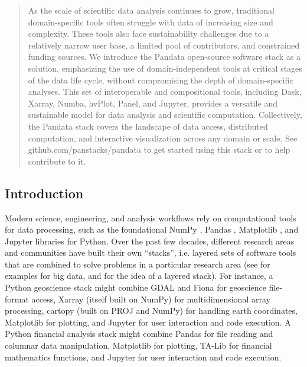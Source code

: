\begin{abstract}
    As the scale of scientific data analysis continues to grow, traditional domain-specific tools often struggle with data of increasing size and complexity. These tools also face sustainability challenges due to a relatively narrow user base, a limited pool of contributors, and constrained funding sources. We introduce the Pandata open-source software stack as a solution, emphasizing the use of domain-independent tools at critical stages of the data life cycle, without compromising the depth of domain-specific analyses. This set of interoperable and compositional tools, including Dask, Xarray, Numba, hvPlot, Panel, and Jupyter, provides a versatile and sustainable model for data analysis and scientific computation. Collectively, the Pandata stack covers the landscape of data access, distributed computation, and interactive visualization across any domain or scale. See github.com/panstacks/pandata to get started using this stack or to help contribute to it.
\end{abstract}

\subsection{Introduction} \label{introduction}

Modern science, engineering, and analysis workflows rely on computational tools for data processing, such as the foundational NumPy \citep{harris:nature20}, Pandas \citep{mckinney:scipy10}, Matplotlib \citep{hunter:cse07}, and Jupyter \citep{kluyver:ppap16} libraries for Python. Over the past few decades, different research areas and communities have built their own ``stacks'', i.e. layered sets of software tools that are combined to solve problems in a particular research area (see \cite{stancin:mipro19} for examples for big data, and \cite{briscoe:pcna00} for the idea of a layered stack). For instance, a Python geoscience stack might combine GDAL and Fiona for geoscience file-format access, Xarray \citep{hoyer:jors17} (itself built on NumPy) for multidimensional array processing, cartopy (built on PROJ and NumPy) for handling earth coordinates, Matplotlib for plotting, and Jupyter for user interaction and code execution. A Python financial analysis stack might combine Pandas for file reading and columnar data manipulation, Matplotlib for plotting, TA-Lib for financial mathematics functions, and Jupyter for user interaction and code execution.

